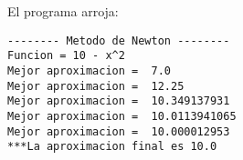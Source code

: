 \documentclass[11pt]{article}
\begin{document}
    El programa arroja:

\begin{verbatim}
-------- Metodo de Newton --------
Funcion = 10 - x^2
Mejor aproximacion =  7.0
Mejor aproximacion =  12.25
Mejor aproximacion =  10.349137931
Mejor aproximacion =  10.0113941065
Mejor aproximacion =  10.000012953
***La aproximacion final es 10.0
\end{verbatim}


    
    
    
    
\end{document}
